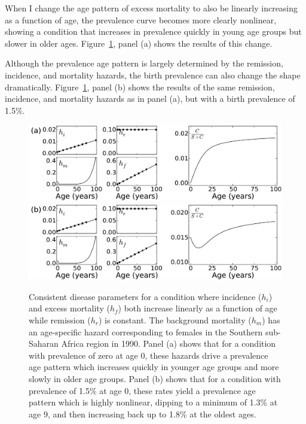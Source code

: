 When I change the age pattern of excess mortality to also be linearly
increasing as a function of age, the prevalence curve
becomes more clearly nonlinear, showing a condition that increases in
prevalence quickly in young age groups but slower in older
ages. Figure~\ref{forward-sim-ex2}, panel (a) shows the results
of this change.

Although the prevalence age pattern is largely determined by the
remission, incidence, and mortality hazards, the birth prevalence can
also change the shape
dramatically. Figure~\ref{forward-sim-ex2}, panel (b)
shows the results of the same remission, incidence, and mortality
hazards as in panel (a), but with a birth prevalence of 1.5\%.

\begin{figure}[htb]
\begin{center}
\includegraphics[width=\textwidth]{more-excess-mortality.pdf}
\includegraphics[width=\textwidth]{birth-prevalence.pdf}

\caption{Consistent disease parameters for a condition where incidence
  ($h_i$) and excess mortality ($h_f$) both increase linearly as a
  function of age while remission ($h_r$) is constant. The background
  mortality ($h_m$) has an age-specific hazard corresponding to females in
  the Southern sub-Saharan Africa region in 1990. Panel (a) shows that for a condition
  with prevalence of zero at age $0$, these hazards drive a prevalence
  age pattern which increases quickly in younger age groups and
  more slowly in older age groups. Panel (b) shows that for a condition with prevalence of
  1.5\% at age $0$, these rates yield a prevalence age pattern which is
  highly nonlinear, dipping to a minimum of 1.3\% at age 9, and then
  increasing back up to 1.8\% at the oldest ages.
}
\label{forward-sim-ex2}
\end{center}
\end{figure}


